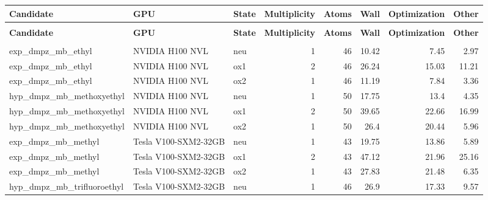 \documentclass[10pt,letterpaper]{article}
\begin{document}
{
\footnotesize
\setlength{\tabcolsep}{4pt}
\renewcommand{\arraystretch}{1.12}
\setlength{\LTleft}{0pt}\setlength{\LTright}{0pt}
\begin{xltabular}{\linewidth}{@{}>{\raggedright\arraybackslash}X>{\raggedright\arraybackslash}p{3.6cm}lrrrrr@{}}
\toprule
\textbf{Candidate} & \textbf{GPU} & \textbf{State} & \textbf{Multiplicity} & \textbf{Atoms} & \textbf{Wall} & \textbf{Optimization} & \textbf{Other} \\
\midrule
\endfirsthead
{} \\
\toprule
\textbf{Candidate} & \textbf{GPU} & \textbf{State} & \textbf{Multiplicity} & \textbf{Atoms} & \textbf{Wall} & \textbf{Optimization} & \textbf{Other} \\
\midrule
\endhead
\midrule
{} \\
\endfoot
\bottomrule
\endlastfoot
exp\_\allowbreak{}dmpz\_\allowbreak{}mb\_\allowbreak{}ethyl & NVIDIA H100 NVL & neu & 1 & 46 & 10.42 & 7.45 & 2.97 \\
exp\_\allowbreak{}dmpz\_\allowbreak{}mb\_\allowbreak{}ethyl & NVIDIA H100 NVL & ox1 & 2 & 46 & 26.24 & 15.03 & 11.21 \\
exp\_\allowbreak{}dmpz\_\allowbreak{}mb\_\allowbreak{}ethyl & NVIDIA H100 NVL & ox2 & 1 & 46 & 11.19 & 7.84 & 3.36 \\
hyp\_\allowbreak{}dmpz\_\allowbreak{}mb\_\allowbreak{}methoxy\-ethyl & NVIDIA H100 NVL & neu & 1 & 50 & 17.75 & 13.4 & 4.35 \\
hyp\_\allowbreak{}dmpz\_\allowbreak{}mb\_\allowbreak{}methoxy\-ethyl & NVIDIA H100 NVL & ox1 & 2 & 50 & 39.65 & 22.66 & 16.99 \\
hyp\_\allowbreak{}dmpz\_\allowbreak{}mb\_\allowbreak{}methoxy\-ethyl & NVIDIA H100 NVL & ox2 & 1 & 50 & 26.4 & 20.44 & 5.96 \\
exp\_\allowbreak{}dmpz\_\allowbreak{}mb\_\allowbreak{}methyl & Tesla V100-\allowbreak{}SXM2-\allowbreak{}32GB & neu & 1 & 43 & 19.75 & 13.86 & 5.89 \\
exp\_\allowbreak{}dmpz\_\allowbreak{}mb\_\allowbreak{}methyl & Tesla V100-\allowbreak{}SXM2-\allowbreak{}32GB & ox1 & 2 & 43 & 47.12 & 21.96 & 25.16 \\
exp\_\allowbreak{}dmpz\_\allowbreak{}mb\_\allowbreak{}methyl & Tesla V100-\allowbreak{}SXM2-\allowbreak{}32GB & ox2 & 1 & 43 & 27.83 & 21.48 & 6.35 \\
hyp\_\allowbreak{}dmpz\_\allowbreak{}mb\_\allowbreak{}tri\-fluoro\-ethyl & Tesla V100-\allowbreak{}SXM2-\allowbreak{}32GB & neu & 1 & 46 & 26.9 & 17.33 & 9.57 \\

\end{xltabular}}
\end{document}
